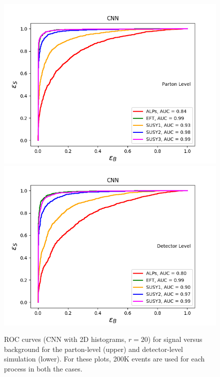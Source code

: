\documentclass[prd,aps,letterpaper,floatfix,superscriptaddress,preprintnumbers,twocolumn,10pt,nofootinbib]{revtex4-1}
\begin{document}
\begin{figure}%
\centering
\includegraphics[scale=0.50]{figures/2D_CNN_sig_vs_bg_LO_ROC.png}
\includegraphics[scale=0.50]{figures/2D_CNN_sig_vs_bg_delphes_ROC.png}
\caption{ROC curves (CNN with 2D histograms, $r = 20$) for signal versus background for the parton-level (upper) and detector-level simulation (lower). For these plots, 200K events are used for each process in both the cases.}\label{2D_CNN_sig_vs_bg_LO_ROC}
\end{figure}
\end{document}

